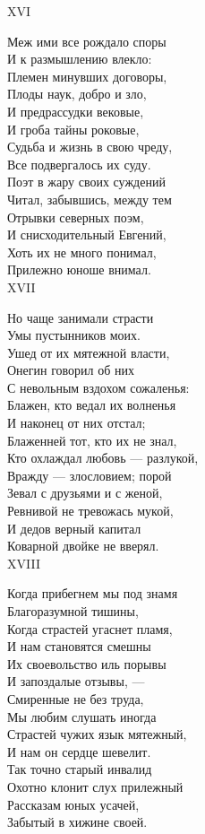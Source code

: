 XVI

Меж ими все рождало споры\\
И к размышлению влекло:\\
Племен минувших договоры,\\
Плоды наук, добро и зло,\\
И предрассудки вековые,\\
И гроба тайны роковые,\\
Судьба и жизнь в свою чреду,\\
Все подвергалось их суду.\\
Поэт в жару своих суждений\\
Читал, забывшись, между тем\\
Отрывки северных поэм,\\
И снисходительный Евгений,\\
Хоть их не много понимал,\\
Прилежно юноше внимал.\\

XVII

Но чаще занимали страсти\\
Умы пустынников моих.\\
Ушед от их мятежной власти,\\
Онегин говорил об них\\
С невольным вздохом сожаленья:\\
Блажен, кто ведал их волненья\\
И наконец от них отстал;\\
Блаженней тот, кто их не знал,\\
Кто охлаждал любовь — разлукой,\\
Вражду — злословием; порой\\
Зевал с друзьями и с женой,\\
Ревнивой не тревожась мукой,\\
И дедов верный капитал\\
Коварной двойке не вверял.\\

XVIII

Когда прибегнем мы под знамя\\
Благоразумной тишины,\\
Когда страстей угаснет пламя,\\
И нам становятся смешны\\
Их своевольство иль порывы\\
И запоздалые отзывы, —\\
Смиренные не без труда,\\
Мы любим слушать иногда\\
Страстей чужих язык мятежный,\\
И нам он сердце шевелит.\\
Так точно старый инвалид\\
Охотно клонит слух прилежный\\
Рассказам юных усачей,\\
Забытый в хижине своей.\\


